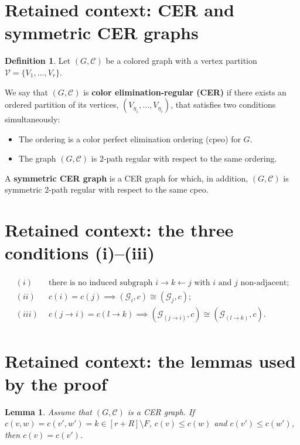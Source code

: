 \documentclass[10pt,a4paper]{amsart}
\newcommand{\1}{\mathbf{1}}
\theoremstyle{plain}
\newtheorem{lemma}[theorem]{Lemma}
\theoremstyle{definition}
\newtheorem{definition}[theorem]{Definition}
\theoremstyle{remark}
\begin{document}
\section*{Retained context: CER and symmetric CER graphs}

\begin{definition}
Let $(G,\mathcal{C})$ be a colored graph with a vertex partition $\mathcal{V}=\{V_1,\ldots,V_r\}$. 

We say that $(G,\mathcal{C})$ is \textbf{color elimination-regular (CER)} if there exists an ordered partition of its vertices, $(V_{\eta_1},\ldots,V_{\eta_r})$, that satisfies two conditions simultaneously:
\begin{itemize}
    \item[(i)] The ordering is a color perfect elimination ordering (cpeo) for $G$. 
    \item[(ii)] The graph $(G,\mathcal{C})$ is $2$-path regular with respect to the same ordering.
\end{itemize}

A \textbf{symmetric CER graph} is a CER graph for which, in addition, $(G,\mathcal{C})$ is symmetric $2$-path regular with respect to the same cpeo.
\end{definition}


\section*{Retained context: the three conditions (i)--(iii)}

\begin{align}\label{eq:i-iii}
\begin{split}
(i)\ & \ \mbox{there is no induced subgraph $i\to k\leftarrow j$ with $i$ and $j$ non-adjacent;}\\
(ii)\ & \ c(i)=c(j)\implies (\mathcal{G}_i,c)\cong (\mathcal{G}_j,c);\\
(iii)\ & \ c(j\to i)=c(l\to k)\implies (\mathcal{G}_{(j\to i)},c)\cong (\mathcal{G}_{(l\to k)},c).
\end{split}
\end{align}


\section*{Retained context: the lemmas used by the proof}

\begin{lemma}\label{lem:L_i}
Assume that $(G,\mathcal{C})$ is a CER graph. If $c(v,w)=c(v',w')=k\in [r+R]\setminus F$, $c(v)\le c(w)$ and $c(v')\le c(w')$, then $c(v)=c(v')$.
\end{lemma}
\end{document}
